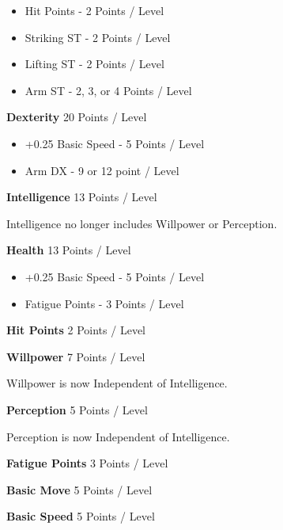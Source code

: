 \begin{multicols*}{3}
\begin{coloredbox}
	\begin{itemize}
		\itemsep0em 
		\item Hit Points - 2 Points / Level
		\item Striking ST - 2 Points / Level
		\item Lifting ST - 2 Points / Level
		\item Arm ST - 2, 3, or 4 Points / Level
	\end{itemize}
	
	\noindent\textbf{Dexterity}
	20 Points / Level
	
	\begin{itemize}
		\itemsep0em 
		\item +0.25 Basic Speed - 5 Points / Level
		\item Arm DX - 9 or 12 point / Level
	\end{itemize}
	
	\noindent\textbf{Intelligence}
	13 Points / Level
	
	\noindent
	Intelligence no longer includes Willpower or Perception.
	
	\noindent\newline\textbf{Health}
	13 Points / Level
	
	\begin{itemize}
		\itemsep 0pt
		\item +0.25 Basic Speed - 5 Points / Level
		\item Fatigue Points - 3 Points / Level
	\end{itemize}
	
	\noindent\newline\textbf{Hit Points}
	2 Points / Level
	
	\noindent\newline\textbf{Willpower }
	7 Points / Level
	
	\noindent
	Willpower is now Independent of Intelligence.
	
	\noindent\newline\textbf{Perception}
	5 Points / Level
	
	\noindent
	Perception is now Independent of Intelligence.
	
	\noindent\newline\textbf{Fatigue Points}
	3 Points / Level
	
	\noindent\newline\textbf{Basic Move}
	5 Points / Level
	
	\noindent\newline\textbf{Basic Speed}
	5 Points / Level
	

\end{coloredbox}
\end{multicols*}
